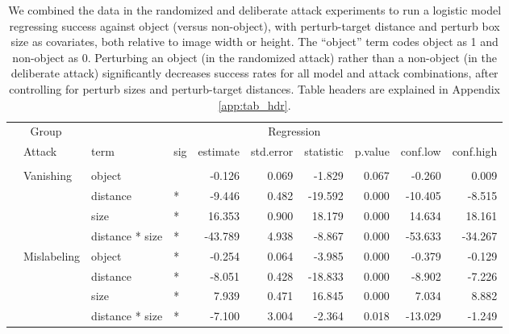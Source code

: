 \documentclass[
]{article}
\begin{document}
\begin{longtable}[t]{llllrrrrrr}
\caption{\label{tab:rand_arb_compare_table}We combined the data in the randomized and deliberate attack experiments to run a logistic model regressing success against object (versus non-object), with perturb-target distance and perturb box size as covariates, both relative to image width or height. The ``object'' term codes object as 1 and non-object as 0. Perturbing an object (in the randomized attack) rather than a non-object (in the deliberate attack) significantly decreases success rates for all model and attack combinations, after controlling for perturb sizes and perturb-target distances. Table headers are explained in Appendix \ref{app:tab_hdr}.}\\
\toprule
\multicolumn{2}{c}{Group} & \multicolumn{8}{c}{Regression} \\
\cmidrule(l{3pt}r{3pt}){1-2} \cmidrule(l{3pt}r{3pt}){3-10}
 & Attack & term & sig & estimate & std.error & statistic & p.value & conf.low & conf.high\\
\midrule
\addlinespace[0.3em]
\multicolumn{10}{l}{\textbf{YOLOv3}}\\
\hspace{1em} & Vanishing & object &  & -0.126 & 0.069 & -1.829 & 0.067 & -0.260 & 0.009\\
\cmidrule{3-10}\nopagebreak
\hspace{1em} &  & distance & * & -9.446 & 0.482 & -19.592 & 0.000 & -10.405 & -8.515\\
\cmidrule{3-10}\nopagebreak
\hspace{1em} &  & size & * & 16.353 & 0.900 & 18.179 & 0.000 & 14.634 & 18.161\\
\cmidrule{3-10}\nopagebreak
\hspace{1em} &  & distance * size & * & -43.789 & 4.938 & -8.867 & 0.000 & -53.633 & -34.267\\
\cmidrule{2-10}\nopagebreak
\hspace{1em} & Mislabeling & object & * & -0.254 & 0.064 & -3.985 & 0.000 & -0.379 & -0.129\\
\cmidrule{3-10}\nopagebreak
\hspace{1em} &  & distance & * & -8.051 & 0.428 & -18.833 & 0.000 & -8.902 & -7.226\\
\cmidrule{3-10}\nopagebreak
\hspace{1em} &  & size & * & 7.939 & 0.471 & 16.845 & 0.000 & 7.034 & 8.882\\
\cmidrule{3-10}\nopagebreak
\hspace{1em} &  & distance * size & * & -7.100 & 3.004 & -2.364 & 0.018 & -13.029 & -1.249\\

\end{longtable}
\end{document}
